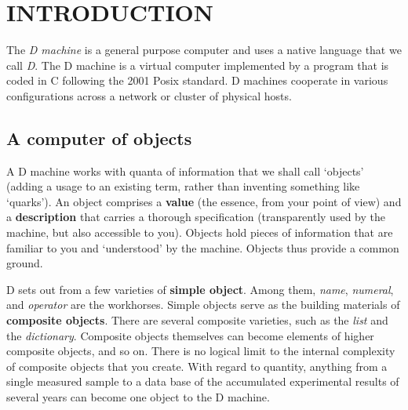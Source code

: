 
%
%
%
%
\chapter{INTRODUCTION}\label{chap:intro}

The \emph{D machine} is a general purpose computer and uses a native language that we call \emph{D}. The D machine is a virtual computer implemented by a program that is coded in C following the 2001 Posix standard. D machines cooperate in various configurations across a network or cluster of physical hosts.


\section{A computer of objects}

A D machine works with quanta of information that we  shall  call `objects'  (adding  a usage to an existing term,  rather  than  inventing something like `quarks').  An object comprises a \textbf{value} (the essence, from your   point  of  view)  and  a  \textbf{description}  that  carries  a   thorough specification (transparently used by the machine,  but also accessible to you).  Objects hold pieces of information that are familiar to you and `understood' by the machine. Objects thus provide  a common ground.

D  sets out from a few varieties of \textbf{simple  object}.  Among  them,  \emph{name}, \emph{numeral},  and \emph{operator} are the workhorses.  Simple objects serve as  the building  materials  of \textbf{composite objects}.  There  are  several  composite varieties,  such as the \emph{list} and  the  \emph{dictionary}. Composite objects themselves can become elements of higher composite objects, and so on.  There  is no logical limit to the internal complexity  of  composite objects that you create.  With regard to quantity, anything from a single measured sample to a data base of the accumulated experimental results of several years can become one object to the D machine.

